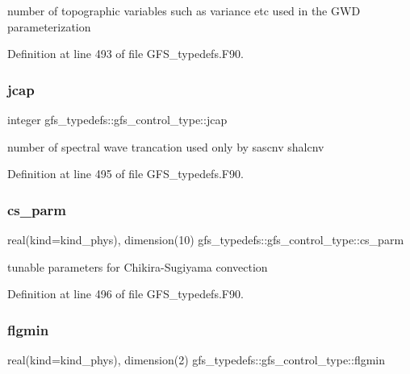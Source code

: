 number of topographic variables such as variance etc used in the G\+WD parameterization 



Definition at line 493 of file G\+F\+S\+\_\+typedefs.\+F90.

\mbox{\label{structgfs__typedefs_1_1gfs__control__type_a483dcc59ab546ced0ccd37f4c06dc270}} 
\subsubsection{jcap}
{\footnotesize\ttfamily integer gfs\+\_\+typedefs\+::gfs\+\_\+control\+\_\+type\+::jcap}



number of spectral wave trancation used only by sascnv shalcnv 



Definition at line 495 of file G\+F\+S\+\_\+typedefs.\+F90.

\mbox{\label{structgfs__typedefs_1_1gfs__control__type_a4abddcd2c7404bd24555584be6cdb9b3}} 
\subsubsection{cs\+\_\+parm}
{\footnotesize\ttfamily real(kind=kind\+\_\+phys), dimension(10) gfs\+\_\+typedefs\+::gfs\+\_\+control\+\_\+type\+::cs\+\_\+parm}



tunable parameters for Chikira-\/\+Sugiyama convection 



Definition at line 496 of file G\+F\+S\+\_\+typedefs.\+F90.

\mbox{\label{structgfs__typedefs_1_1gfs__control__type_a20f9774857aa518bb42fafcc429ad650}} 
\subsubsection{flgmin}
{\footnotesize\ttfamily real(kind=kind\+\_\+phys), dimension(2) gfs\+\_\+typedefs\+::gfs\+\_\+control\+\_\+type\+::flgmin}



